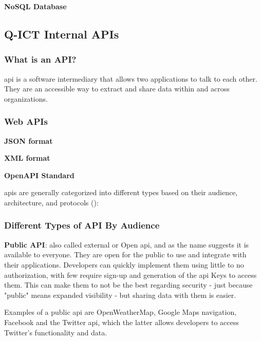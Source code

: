 \begin{multicols}{2}
      \textbf{NoSQL Database}

      \subsection{Q-ICT Internal APIs}
      \subsubsection{What is an API?}
      \acrshort{api} is a software intermediary that allows two applications to talk to each other. They are an
      accessible way to extract and share data within and across organizations.
      \subsubsection{Web APIs}
      
      \textbf{JSON format}

      \textbf{XML format}

      \textbf{OpenAPI Standard}

      \acrshort{api}s are generally categorized into different types based on their audience, architecture, and
      protocols (\cite{typesofapi}):
      \subsubsection{Different Types of API By Audience}
      \textbf{Public API}: also called external or Open \acrshort{api}, and as the name suggests it is available 
      to everyone. They are open for the public to use and integrate with their applications. Developers can quickly 
      implement them using little to no authorization, with few require sign-up and generation of the \acrshort{api} Keys
      to access them. This can make them to not be the best regarding security - just because "public" means expanded
      visibility - but sharing data with them is easier. 
      
      Examples of a public \acrshort{api} are OpenWeatherMap, Google Maps navigation, Facebook and the Twitter \acrshort{api}, 
      which the latter allows  developers to access Twitter's functionality and data. 


\end{multicols}
